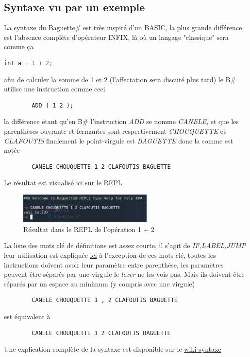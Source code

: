 \documentclass[11pt,colorlinks=true,a4paper]{article}
\newcommand{\bsf}{Baguette\# }
\newcommand{\bs}{B\# }
\begin{document}
    \subsection{Syntaxe vu par un exemple}
    \label{Exemple}
    La syntaxe du \bsf est très inspiré d'un BASIC, la plus grande différence est l'absence complète d'opérateur INFIX,
    là où un langage "classique" sera comme ça
    \begin{lstlisting}[language=Java]
        int a = 1 + 2;
    \end{lstlisting}
    afin de calculer la somme de 1 et 2 (l'affectation sera discuté plus tard) le \bs utilise une instruction comme ceci 
    \begin{lstlisting}
        ADD ( 1 2 );
    \end{lstlisting}
    la différence étant qu'en \bs l'instruction \textit{ADD} se nomme \textit{CANELE}, et que les parenthèses ouvrante et fermantes 
    sont respectivement \textit{CHOUQUETTE} et \textit{CLAFOUTIS} finalement le point-virgule est \textit{BAGUETTE} donc la somme est
    notée 
    \begin{lstlisting}
        CANELE CHOUQUETTE 1 2 CLAFOUTIS BAGUETTE
    \end{lstlisting}
    Le résultat est visualisé ici sur le REPL
    \begin{figure}[H]
        \center
        \includegraphics[width=0.6\textwidth]{img/add.png}
        \caption{Résultat dans le REPL de l'opération 1 + 2}
    \end{figure}
    
    La liste des mots clé de définitions est assez courte, il s'agit de \textit{IF,LABEL,JUMP} leur utilisation est expliquée \href{https://www.baguettesharp.fr/advanced.html#labels}{ici}
    à l'exception de ces mots clé, toutes les instructions doivent avoir leur paramètre entre parenthèse, les paramètres peuvent 
    être séparés par une virgule le \textit{lexer} ne les vois pas. Mais ils doivent être séparés par un espace au minimum (y compris avec une virgule)
    \begin{lstlisting}
        CANELE CHOUQUETTE 1 , 2 CLAFOUTIS BAGUETTE
    \end{lstlisting}
    est équivalent à 
    \begin{lstlisting}
        CANELE CHOUQUETTE 1 2 CLAFOUTIS BAGUETTE
    \end{lstlisting}
    Une explication complète de la syntaxe est disponible sur le \href{https://github.com/coco33920/ocaml-baguettesharp-interpreter/wiki/The-basics#syntax}{wiki-syntaxe}
\end{document}
